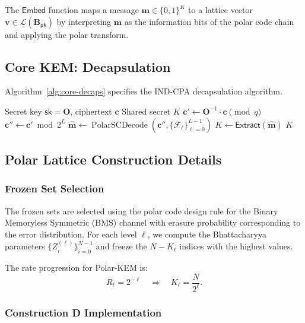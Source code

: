 \documentclass[11pt,a4paper]{article}
\newcommand{\polarKem}{\textsf{Polar-KEM}\xspace}
\newcommand{\CoreKEM}{\textsf{Core.KEM}\xspace}
\newcommand{\Extract}{\textsf{Extract}\xspace}
\newcommand{\INDCPA}{\textsf{IND-CPA}\xspace}
\newcommand{\bit}{\{0,1\}}
\newcommand{\pk}{\mathsf{pk}}
\newcommand{\sk}{\mathsf{sk}}
\DeclareMathOperator{\polarScDec}{PolarSCDecode}
\begin{document}
The $\mathsf{Embed}$ function maps a message $\mathbf{m} \in \bit^K$ to a lattice vector $\mathbf{v} \in \mathcal{L}(\mathbf{B}_{\pk})$ by interpreting $\mathbf{m}$ as the information bits of the polar code chain and applying the polar transform.

\subsection{Core KEM: Decapsulation}\label{sec:core-decaps}

Algorithm~\ref{alg:core-decaps} specifies the \INDCPA decapsulation algorithm.

\begin{algorithm}[H]
\caption{$\CoreKEM.\mathsf{Decaps}(\sk, \mathbf{c})$}
\label{alg:core-decaps}
\begin{algorithmic}[1]
\REQUIRE Secret key $\sk = \mathbf{O}$, ciphertext $\mathbf{c}$
\ENSURE Shared secret $K$
\STATE $\mathbf{c}' \gets \mathbf{O}^{-1} \cdot \mathbf{c} \pmod{q}$ 
\STATE $\mathbf{c}'' \gets \mathbf{c}' \bmod 2^L$ 
\STATE $\widehat{\mathbf{m}} \gets \polarScDec(\mathbf{c}'', \{\mathcal{F}_\ell\}_{\ell=0}^{L-1})$ 
\STATE $K \gets \Extract(\widehat{\mathbf{m}})$
\RETURN $K$
\end{algorithmic}
\end{algorithm}

\subsection{Polar Lattice Construction Details}\label{sec:polar-construction}

\subsubsection{Frozen Set Selection}

The frozen sets are selected using the polar code design rule for the Binary Memoryless Symmetric (BMS) channel with erasure probability corresponding to the error distribution. For each level $\ell$, we compute the Bhattacharyya parameters $\{Z_i^{(\ell)}\}_{i=0}^{N-1}$ and freeze the $N - K_\ell$ indices with the highest values.

The rate progression for \polarKem is:
\[
R_\ell = 2^{-\ell} \quad \Rightarrow \quad K_\ell = \frac{N}{2^\ell}.
\]

\subsubsection{Construction D Implementation}
\end{document}
